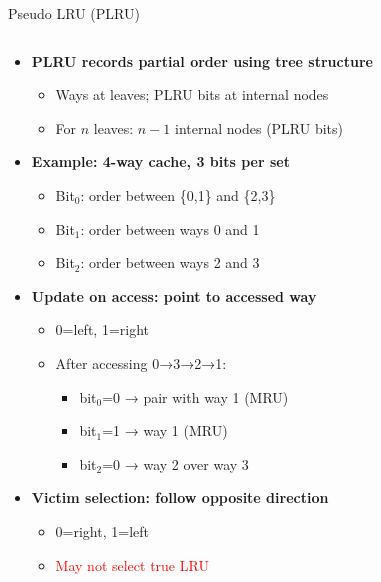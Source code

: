 \documentclass[aspectratio=169,12pt]{beamer}
\begin{document}
\begin{frame}{Pseudo LRU (PLRU)}
\begin{columns}
\begin{column}{0.75\textwidth}
\begin{itemize}
  \item \textbf{PLRU records partial order using tree structure}
  \begin{itemize}
    \item Ways at leaves; PLRU bits at internal nodes
    \item For $n$ leaves: $n-1$ internal nodes (PLRU bits)
  \end{itemize}
  
  \vspace{0.2cm}
  
  \item \textbf{Example: 4-way cache, 3 bits per set}
  \begin{itemize}
    \item Bit$_0$: order between \{0,1\} and \{2,3\}
    \item Bit$_1$: order between ways 0 and 1
    \item Bit$_2$: order between ways 2 and 3
  \end{itemize}
  
  \vspace{0.2cm}
  
  \item \textbf{Update on access: point to accessed way}
  \begin{itemize}
    \item 0=left, 1=right
    \item After accessing 0→3→2→1:
    \begin{itemize}
      \item bit$_0$=0 → pair with way 1 (MRU)
      \item bit$_1$=1 → way 1 (MRU)
      \item bit$_2$=0 → way 2 over way 3
    \end{itemize}
  \end{itemize}
  
  \vspace{0.2cm}
  
  \item \textbf{Victim selection: follow opposite direction}
  \begin{itemize}
    \item 0=right, 1=left
    \item \textcolor{red}{May not select true LRU}
  \end{itemize}
\end{itemize}
\end{column}


\end{columns}
\end{frame}
\end{document}
